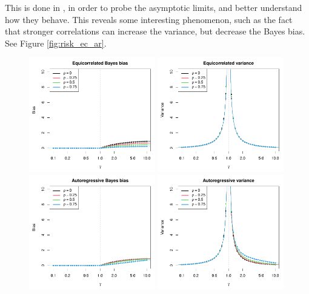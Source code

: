 \documentclass{article}
\begin{document}
This is done in \citet{hastie2022surprises}, in order to probe the asymptotic
limits, and better understand how they behave. This reveals some interesting
phenomenon, such as the fact that stronger correlations can increase the
variance, but decrease the Bayes bias. See Figure \ref{fig:risk_ec_ar}.

\begin{figure}[p]
\centering
\includegraphics[width=0.49\textwidth]{bias_ec.pdf}
\includegraphics[width=0.49\textwidth]{var_ec.pdf}
\includegraphics[width=0.49\textwidth]{bias_ar.pdf}
\includegraphics[width=0.49\textwidth]{var_ar.pdf}

\end{figure}
\end{document}
